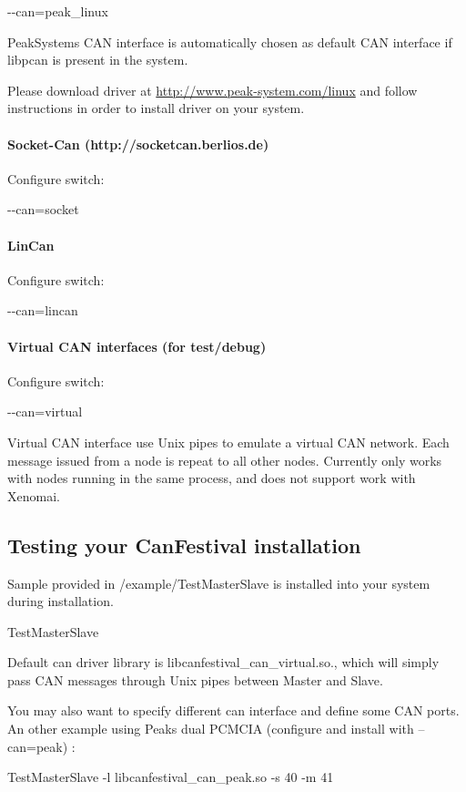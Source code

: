 \documentclass[a4paper,12pt]{book}
\begin{document}
{\ttfamily
{}-{}-can=peak\_linux}

PeakSystems CAN interface is automatically chosen as default CAN
interface if libpcan is present in the system.

Please download driver at
\href{http://www.peak-system.com/linux}{http://www.peak{}-system.com/linux}
and follow instructions in order to install driver on your system.

\paragraph{Socket{}-Can (http://socketcan.berlios.de)}
Configure switch:

{\ttfamily
{}-{}-can=socket}

\paragraph{LinCan}
Configure switch:

{\ttfamily
{}-{}-can=lincan}

\paragraph{Virtual CAN interfaces (for test/debug)}
Configure switch:

{\ttfamily
{}-{}-can=virtual}

Virtual CAN interface use Unix pipes to emulate a virtual CAN network.
Each message issued from a node is repeat to all other nodes. Currently
only works with nodes running in the same process, and does not support
work with Xenomai.

\subsection{Testing your CanFestival installation}
Sample provided in /example/TestMasterSlave is installed into your
system during installation.

{\ttfamily
TestMasterSlave}

Default can driver library is libcanfestival\_can\_virtual.so., which
will simply pass CAN messages through Unix pipes between Master and
Slave. 

You may also want to specify different can interface and define some CAN
ports. An other example using Peak{\textquotesingle}s dual PCMCIA
(configure and install with {--}can=peak) :

{\ttfamily
TestMasterSlave {}-l libcanfestival\_can\_peak.so {}-s 40 {}-m 41}
\end{document}
